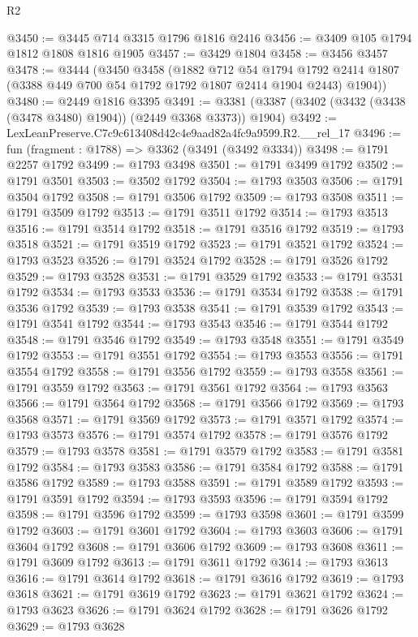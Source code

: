 \begin{lexlean}{R2}
\begin{coremodule}
@3450 := @3445 @714 @3315 @1796 @1816 @2416
@3456 := @3409 @105 @1794 @1812 @1808 @1816 @1905
@3457 := @3429 @1804
@3458 := @3456 @3457
@3478 := @3444
    (@3450
      @3458
      (@1882
        @712
        @54
        @1794
        @1792
        @2414
        @1807
        (@3388 @449 @700 @54 @1792 @1792 @1807 @2414 @1904 @2443)
        @1904))
@3480 := @2449 @1816 @3395
@3491 := @3381 (@3387 (@3402 (@3432 (@3438 (@3478 @3480) @1904)) (@2449 @3368 @3373)) @1904)
@3492 := LexLeanPreserve.C7c9c613408d42c4e9aad82a4fc9a9599.R2.__rel_17
@3496 := fun (fragment : @1788) => @3362 (@3491 (@3492 @3334))
@3498 := @1791 @2257 @1792
@3499 := @1793 @3498
@3501 := @1791 @3499 @1792
@3502 := @1791 @3501
@3503 := @3502 @1792
@3504 := @1793 @3503
@3506 := @1791 @3504 @1792
@3508 := @1791 @3506 @1792
@3509 := @1793 @3508
@3511 := @1791 @3509 @1792
@3513 := @1791 @3511 @1792
@3514 := @1793 @3513
@3516 := @1791 @3514 @1792
@3518 := @1791 @3516 @1792
@3519 := @1793 @3518
@3521 := @1791 @3519 @1792
@3523 := @1791 @3521 @1792
@3524 := @1793 @3523
@3526 := @1791 @3524 @1792
@3528 := @1791 @3526 @1792
@3529 := @1793 @3528
@3531 := @1791 @3529 @1792
@3533 := @1791 @3531 @1792
@3534 := @1793 @3533
@3536 := @1791 @3534 @1792
@3538 := @1791 @3536 @1792
@3539 := @1793 @3538
@3541 := @1791 @3539 @1792
@3543 := @1791 @3541 @1792
@3544 := @1793 @3543
@3546 := @1791 @3544 @1792
@3548 := @1791 @3546 @1792
@3549 := @1793 @3548
@3551 := @1791 @3549 @1792
@3553 := @1791 @3551 @1792
@3554 := @1793 @3553
@3556 := @1791 @3554 @1792
@3558 := @1791 @3556 @1792
@3559 := @1793 @3558
@3561 := @1791 @3559 @1792
@3563 := @1791 @3561 @1792
@3564 := @1793 @3563
@3566 := @1791 @3564 @1792
@3568 := @1791 @3566 @1792
@3569 := @1793 @3568
@3571 := @1791 @3569 @1792
@3573 := @1791 @3571 @1792
@3574 := @1793 @3573
@3576 := @1791 @3574 @1792
@3578 := @1791 @3576 @1792
@3579 := @1793 @3578
@3581 := @1791 @3579 @1792
@3583 := @1791 @3581 @1792
@3584 := @1793 @3583
@3586 := @1791 @3584 @1792
@3588 := @1791 @3586 @1792
@3589 := @1793 @3588
@3591 := @1791 @3589 @1792
@3593 := @1791 @3591 @1792
@3594 := @1793 @3593
@3596 := @1791 @3594 @1792
@3598 := @1791 @3596 @1792
@3599 := @1793 @3598
@3601 := @1791 @3599 @1792
@3603 := @1791 @3601 @1792
@3604 := @1793 @3603
@3606 := @1791 @3604 @1792
@3608 := @1791 @3606 @1792
@3609 := @1793 @3608
@3611 := @1791 @3609 @1792
@3613 := @1791 @3611 @1792
@3614 := @1793 @3613
@3616 := @1791 @3614 @1792
@3618 := @1791 @3616 @1792
@3619 := @1793 @3618
@3621 := @1791 @3619 @1792
@3623 := @1791 @3621 @1792
@3624 := @1793 @3623
@3626 := @1791 @3624 @1792
@3628 := @1791 @3626 @1792
@3629 := @1793 @3628

\end{coremodule}
\end{lexlean}
